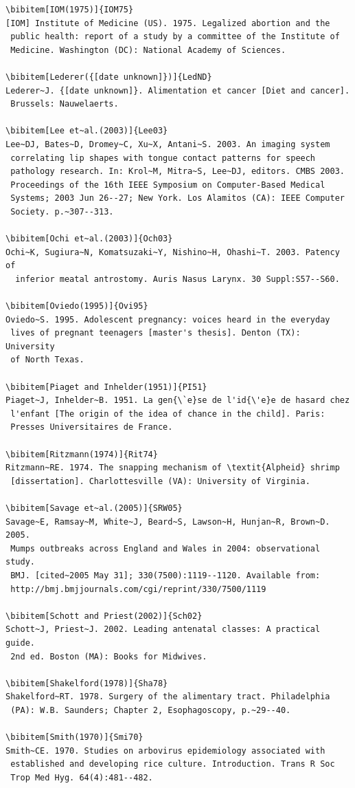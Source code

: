 \documentclass[]{interact}
\theoremstyle{plain}%
\theoremstyle{definition}
\theoremstyle{remark}
\begin{document}
\begin{verbatim}
\bibitem[IOM(1975)]{IOM75}
[IOM] Institute of Medicine (US). 1975. Legalized abortion and the
 public health: report of a study by a committee of the Institute of
 Medicine. Washington (DC): National Academy of Sciences.

\bibitem[Lederer({[date unknown]})]{LedND}
Lederer~J. {[date unknown]}. Alimentation et cancer [Diet and cancer].
 Brussels: Nauwelaerts.

\bibitem[Lee et~al.(2003)]{Lee03}
Lee~DJ, Bates~D, Dromey~C, Xu~X, Antani~S. 2003. An imaging system
 correlating lip shapes with tongue contact patterns for speech
 pathology research. In: Krol~M, Mitra~S, Lee~DJ, editors. CMBS 2003.
 Proceedings of the 16th IEEE Symposium on Computer-Based Medical
 Systems; 2003 Jun 26--27; New York. Los Alamitos (CA): IEEE Computer
 Society. p.~307--313.

\bibitem[Ochi et~al.(2003)]{Och03}
Ochi~K, Sugiura~N, Komatsuzaki~Y, Nishino~H, Ohashi~T. 2003. Patency of
  inferior meatal antrostomy. Auris Nasus Larynx. 30 Suppl:S57--S60.

\bibitem[Oviedo(1995)]{Ovi95}
Oviedo~S. 1995. Adolescent pregnancy: voices heard in the everyday
 lives of pregnant teenagers [master's thesis]. Denton (TX): University
 of North Texas.

\bibitem[Piaget and Inhelder(1951)]{PI51}
Piaget~J, Inhelder~B. 1951. La gen{\`e}se de l'id{\'e}e de hasard chez
 l'enfant [The origin of the idea of chance in the child]. Paris:
 Presses Universitaires de France.

\bibitem[Ritzmann(1974)]{Rit74}
Ritzmann~RE. 1974. The snapping mechanism of \textit{Alpheid} shrimp
 [dissertation]. Charlottesville (VA): University of Virginia.

\bibitem[Savage et~al.(2005)]{SRW05}
Savage~E, Ramsay~M, White~J, Beard~S, Lawson~H, Hunjan~R, Brown~D. 2005.
 Mumps outbreaks across England and Wales in 2004: observational study.
 BMJ. [cited~2005 May 31]; 330(7500):1119--1120. Available from:
 http://bmj.bmjjournals.com/cgi/reprint/330/7500/1119

\bibitem[Schott and Priest(2002)]{Sch02}
Schott~J, Priest~J. 2002. Leading antenatal classes: A practical guide.
 2nd ed. Boston (MA): Books for Midwives.

\bibitem[Shakelford(1978)]{Sha78}
Shakelford~RT. 1978. Surgery of the alimentary tract. Philadelphia
 (PA): W.B. Saunders; Chapter 2, Esophagoscopy, p.~29--40.

\bibitem[Smith(1970)]{Smi70}
Smith~CE. 1970. Studies on arbovirus epidemiology associated with
 established and developing rice culture. Introduction. Trans R Soc
 Trop Med Hyg. 64(4):481--482.


\end{verbatim}
\end{document}
